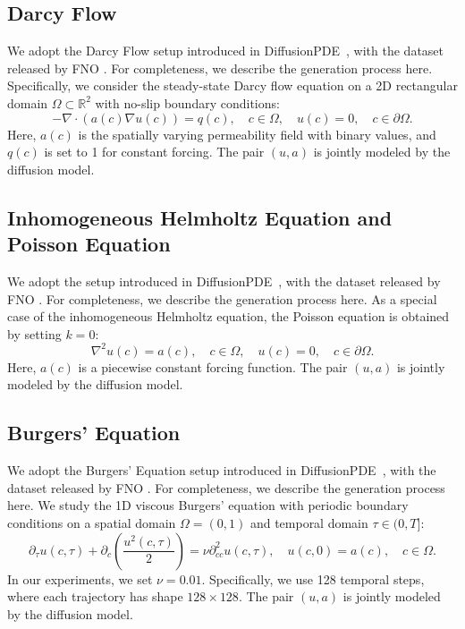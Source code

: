 \documentclass{article}
\theoremstyle{plain}
\theoremstyle{definition}
\theoremstyle{remark}
\begin{document}
\subsection{Darcy Flow}
We adopt the Darcy Flow setup introduced in DiffusionPDE~\cite{huang2024diffusionpde}, with the dataset released by FNO \cite{li2020fno}. For completeness, we describe the generation process here. Specifically, we consider the steady-state Darcy flow equation on a 2D rectangular domain $\Omega \subset \mathbb{R}^2$ with no-slip boundary conditions:
\[
- \nabla \cdot (a(c) \nabla u(c)) = q(c), \quad c \in \Omega, \quad u(c) = 0, \quad c \in \partial \Omega.
\]
Here, $a(c)$ is the spatially varying permeability field with binary values, and $q(c)$ is set to 1 for constant forcing. The pair $(u, a)$ is jointly modeled by the diffusion model.

\subsection{Inhomogeneous Helmholtz Equation and Poisson Equation}
We adopt the setup introduced in DiffusionPDE~\cite{huang2024diffusionpde}, with the dataset released by FNO \cite{li2020fno}. For completeness, we describe the generation process here. As a special case of the inhomogeneous Helmholtz equation, the Poisson equation is obtained by setting $k = 0$:
\[
\nabla^2 u(c) = a(c), \quad c \in \Omega, \quad u(c) = 0, \quad c \in \partial \Omega.
\]
Here, $a(c)$ is a piecewise constant forcing function. The pair $(u, a)$ is jointly modeled by the diffusion model.





\subsection{Burgers' Equation}
We adopt the Burgers' Equation setup introduced in DiffusionPDE~\cite{huang2024diffusionpde}, with the dataset released by FNO \cite{li2020fno}. For completeness, we describe the generation process here. We study the 1D viscous Burgers’ equation with periodic boundary conditions on a spatial domain $\Omega = (0,1)$ and temporal domain $\tau \in (0, T]$:
\[
\partial_\tau u(c, \tau) + \partial_c \left(\frac{u^2(c,\tau)}{2} \right) = \nu \partial^2_{cc} u(c, \tau), \quad u(c, 0) = a(c), \quad c \in \Omega.
\]
In our experiments, we set $\nu = 0.01$. Specifically, we use 128 temporal steps, where each trajectory has shape $128 \times 128$. The pair $(u, a)$ is jointly modeled by the diffusion model.
\end{document}
